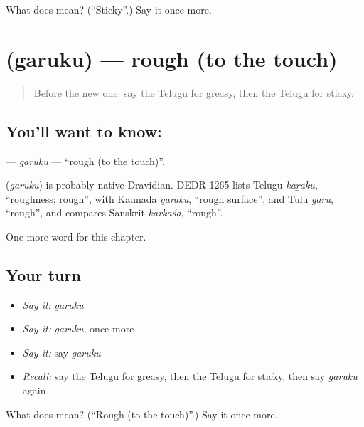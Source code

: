 \begin{tcolorbox}[breakable,colback=teal!4,colframe=teal!35!black,title={Before you move on}]
What does  mean? (\textquotedblleft{}Sticky\textquotedblright{}.) Say it once more.
\end{tcolorbox}
\section[\texorpdfstring{\te{గరుకు} (garuku)}{గరుకు (garuku)}]{ (garuku) — rough (to the touch)}

\label{lesson:TE-C261-garuku}



\begin{quote}
Before the new one: say the Telugu for greasy, then the Telugu for sticky.
\end{quote}

\subsection*{You'll want to know: }
\textbf{} — \emph{garuku} — \textquotedblleft{}rough (to the touch)\textquotedblright{}.

\begin{cousinweb}
\textbf{} (\emph{garuku}) is probably native Dravidian. DEDR 1265 lists Telugu \emph{kaṟaku}, \textquotedblleft{}roughness; rough\textquotedblright{}, with Kannada \emph{garaku}, \textquotedblleft{}rough surface\textquotedblright{}, and Tulu \emph{garu}, \textquotedblleft{}rough\textquotedblright{}, and compares Sanskrit \emph{karkaśa}, \textquotedblleft{}rough\textquotedblright{}.
\end{cousinweb}

\begin{grammarlens}[title={What you've built}]
One more word for this chapter.
\end{grammarlens}

\subsection*{Your turn}
\begin{itemize}
\raggedright
  \item \emph{Say it:} \emph{garuku}
  \item \emph{Say it:} \emph{garuku}, once more
  \item \emph{Say it:} say \emph{garuku}
  \item \emph{Recall:} say the Telugu for greasy, then the Telugu for sticky, then say \emph{garuku} again
\end{itemize}

\begin{tcolorbox}[breakable,colback=teal!4,colframe=teal!35!black,title={Before you move on}]
What does  mean? (\textquotedblleft{}Rough (to the touch)\textquotedblright{}.) Say it once more.
\end{tcolorbox}
